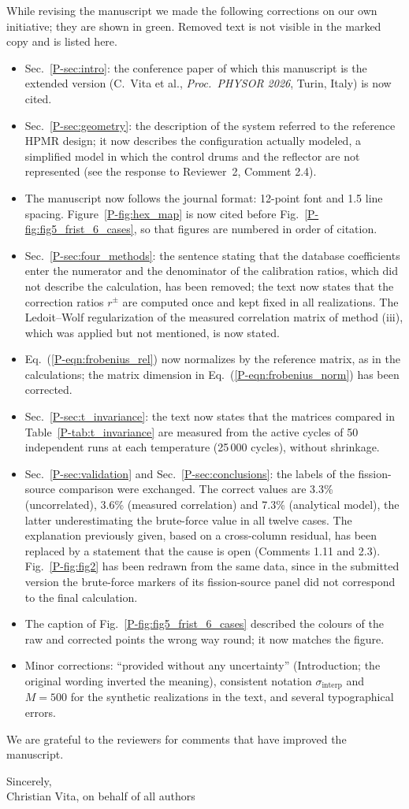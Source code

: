 \documentclass[11pt]{article}
\begin{document}
While revising the manuscript we made the following corrections on our own initiative; they are shown in {\color{green!50!black}green}. Removed text is not visible in the marked copy and is listed here.
\begin{itemize}
\item Sec.~\ref{P-sec:intro}: the conference paper of which this manuscript is the extended version (C.~Vita et al., \emph{Proc.\ PHYSOR 2026}, Turin, Italy) is now cited.
\item Sec.~\ref{P-sec:geometry}: the description of the system referred to the reference HPMR design; it now describes the configuration actually modeled, a simplified model in which the control drums and the reflector are not represented (see the response to Reviewer~2, Comment 2.4).
\item The manuscript now follows the journal format: 12-point font and 1.5 line spacing. Figure~\ref{P-fig:hex_map} is now cited before Fig.~\ref{P-fig:fig5_frist_6_cases}, so that figures are numbered in order of citation.
\item Sec.~\ref{P-sec:four_methods}: the sentence stating that the database coefficients enter the numerator and the denominator of the calibration ratios, which did not describe the calculation, has been removed; the text now states that the correction ratios $r^\pm$ are computed once and kept fixed in all realizations. The Ledoit--Wolf regularization of the measured correlation matrix of method (iii), which was applied but not mentioned, is now stated.
\item Eq.~(\ref{P-eqn:frobenius_rel}) now normalizes by the reference matrix, as in the calculations; the matrix dimension in Eq.~(\ref{P-eqn:frobenius_norm}) has been corrected.
\item Sec.~\ref{P-sec:t_invariance}: the text now states that the matrices compared in Table~\ref{P-tab:t_invariance} are measured from the active cycles of 50 independent runs at each temperature (25\,000 cycles), without shrinkage.
\item Sec.~\ref{P-sec:validation} and Sec.~\ref{P-sec:conclusions}: the labels of the fission-source comparison were exchanged. The correct values are 3.3\% (uncorrelated), 3.6\% (measured correlation) and 7.3\% (analytical model), the latter underestimating the brute-force value in all twelve cases. The explanation previously given, based on a cross-column residual, has been replaced by a statement that the cause is open (Comments 1.11 and 2.3). Fig.~\ref{P-fig:fig2} has been redrawn from the same data, since in the submitted version the brute-force markers of its fission-source panel did not correspond to the final calculation.
\item The caption of Fig.~\ref{P-fig:fig5_frist_6_cases} described the colours of the raw and corrected points the wrong way round; it now matches the figure.
\item Minor corrections: ``provided without any uncertainty'' (Introduction; the original wording inverted the meaning), consistent notation $\sigma_{\text{interp}}$ and $M=500$ for the synthetic realizations in the text, and several typographical errors.
\end{itemize}

\bigskip
\noindent We are grateful to the reviewers for comments that have improved the manuscript.

\medskip
\noindent Sincerely,\\
Christian Vita, on behalf of all authors
\end{document}
